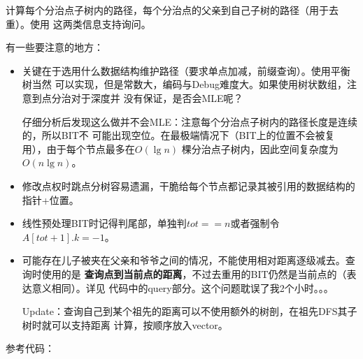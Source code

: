 计算每个分治点子树内的路径，每个分治点的父亲到自己子树的路径（用于去重）。使用
这两类信息支持询问。

有一些要注意的地方：
\begin{itemize}
    \item 关键在于选用什么数据结构维护路径（要求单点加减，前缀查询）。使用平衡树当然
    可以实现，但是常数大，编码与Debug难度大。如果使用树状数组，注意到点分治对于深度并
    没有保证，是否会MLE呢？

    仔细分析后发现这么做并不会MLE：注意每个分治点子树内的路径长度是连续的，所以BIT不
    可能出现空位。在最极端情况下（BIT上的位置不会被复用），由于每个节点最多在$O(\lg n)$
    棵分治点子树内，因此空间复杂度为$O(n\lg n)$。
    \item 修改点权时跳点分树容易遗漏，干脆给每个节点都记录其被引用的数据结构的指针+位置。
    \item 线性预处理BIT时记得判尾部，单独判$tot==n$或者强制令$A[tot+1].k=-1$。
    \item 可能存在儿子被夹在父亲和爷爷之间的情况，不能使用相对距离逐级减去。查询时使用的是
    {\bfseries 查询点到当前点的距离}，不过去重用的BIT仍然是当前点的（表达意义相同）。详见
    代码中的query部分。这个问题耽误了我2个小时。。。

    Update：查询自己到某个祖先的距离可以不使用额外的树剖，在祖先DFS其子树时就可以支持距离
    计算，按顺序放入vector。
\end{itemize}

参考代码：

